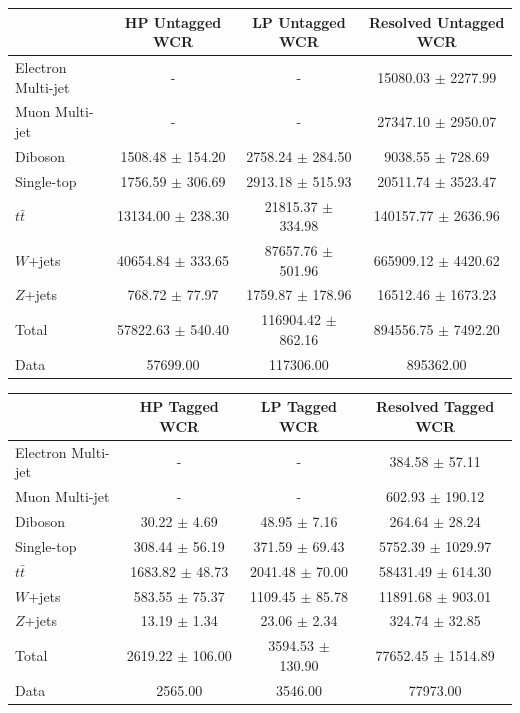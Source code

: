 \begin{table}
\begin{tabular}{|l|c|c|c|}
\hline
	  &	 HP  Untagged WCR &	 LP Untagged WCR &	Resolved Untagged WCR \\\hline 
	Electron Multi-jet &	- &	- &	15080.03 $\pm$ 2277.99 \\\hline 
	Muon Multi-jet &	- &	- &	27347.10 $\pm$ 2950.07 \\\hline 
	Diboson &	1508.48 $\pm$ 154.20 &	2758.24 $\pm$ 284.50 &	9038.55 $\pm$ 728.69 \\\hline 
	Single-top &	1756.59 $\pm$ 306.69 &	2913.18 $\pm$ 515.93 &	20511.74 $\pm$ 3523.47 \\\hline 
	$t\bar{t}$ &	13134.00 $\pm$ 238.30 &	21815.37 $\pm$ 334.98 &	140157.77 $\pm$ 2636.96 \\\hline 
	$W$+jets &	40654.84 $\pm$ 333.65 &	87657.76 $\pm$ 501.96 &	665909.12 $\pm$ 4420.62 \\\hline 
	$Z$+jets &	768.72 $\pm$ 77.97 &	1759.87 $\pm$ 178.96 &	16512.46 $\pm$ 1673.23 \\\hline 
	Total &	57822.63 $\pm$ 540.40 &	116904.42 $\pm$ 862.16 &	894556.75 $\pm$ 7492.20 \\\hline 
	Data &	57699.00 &	117306.00 &	895362.00 \\\hline 
\end{tabular}


\begin{tabular}{|l|c|c|c|}
\hline
	  &	 HP Tagged WCR &	 LP Tagged WCR &	Resolved Tagged WCR \\\hline 
	Electron Multi-jet &	- &	- &	384.58 $\pm$ 57.11 \\\hline 
	Muon Multi-jet &	- &	- &	602.93 $\pm$ 190.12 \\\hline 
	Diboson &	30.22 $\pm$ 4.69 &	48.95 $\pm$ 7.16 &	264.64 $\pm$ 28.24 \\\hline 
	Single-top &	308.44 $\pm$ 56.19 &	371.59 $\pm$ 69.43 &	5752.39 $\pm$ 1029.97 \\\hline 
	$t\bar{t}$ &	1683.82 $\pm$ 48.73 &	2041.48 $\pm$ 70.00 &	58431.49 $\pm$ 614.30 \\\hline 
	$W$+jets &	583.55 $\pm$ 75.37 &	1109.45 $\pm$ 85.78 &	11891.68 $\pm$ 903.01 \\\hline 
	$Z$+jets &	13.19 $\pm$ 1.34 &	23.06 $\pm$ 2.34 &	324.74 $\pm$ 32.85 \\\hline 
	Total &	2619.22 $\pm$ 106.00 &	3594.53 $\pm$ 130.90 &	77652.45 $\pm$ 1514.89 \\\hline 
	Data &	2565.00 &	3546.00 &	77973.00 \\\hline 
\end{tabular}


\end{table}

